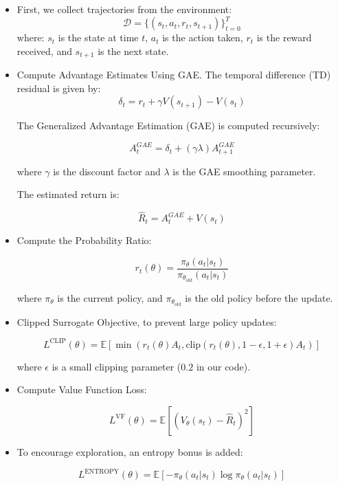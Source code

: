 \documentclass[../CSC_52081_EP.tex]{subfiles}
\begin{document}
\begin{itemize}
    \item First, we collect trajectories from the environment:
    \[
    \mathcal{D} = \{ (s_t, a_t, r_t, s_{t+1}) \}_{t=0}^{T}
    \]
    where:
    \( s_t \) is the state at time \( t \), \( a_t \) is the action taken, \( r_t \) is the reward received, and \( s_{t+1} \) is the next state.

    \item Compute Advantage Estimates Using GAE. The temporal difference (TD) residual is given by:
    \[
    \delta_t = r_t + \gamma V(s_{t+1}) - V(s_t)
    \]
    
    The Generalized Advantage Estimation (GAE) is computed recursively:
    
    \[
    A_t^{GAE} = \delta_t + (\gamma \lambda) A_{t+1}^{GAE}
    \]
    
    where \( \gamma \) is the discount factor and \( \lambda \) is the GAE smoothing parameter.

    The estimated return is:

    \[
    \hat{R}_t = A_t^{GAE} + V(s_t)
    \]

    \item Compute the Probability Ratio:

    \[
    r_t(\theta) = \frac{\pi_{\theta}(a_t | s_t)}{\pi_{\theta_{\text{old}}}(a_t | s_t)}
    \]
    
    where \( \pi_{\theta} \) is the current policy, and \( \pi_{\theta_{\text{old}}} \) is the old policy before the update.

    \item Clipped Surrogate Objective, to prevent large policy updates:

    \[
    L^{\text{CLIP}}(\theta) = \mathbb{E} \left[ \min \left( r_t(\theta) A_t, \text{clip}(r_t(\theta), 1 - \epsilon, 1 + \epsilon) A_t \right) \right]
    \]
    
    where \( \epsilon \) is a small clipping parameter (\( 0.2 \) in our code).

    \item Compute Value Function Loss:

    \[
    L^{\text{VF}}(\theta) = \mathbb{E} \left[ (V_{\theta}(s_t) - \hat{R}_t)^2 \right]
    \]

    \item To encourage exploration, an entropy bonus is added:

    \[
    L^{\text{ENTROPY}}(\theta) = \mathbb{E} \left[ -\pi_{\theta}(a_t | s_t) \log \pi_{\theta}(a_t | s_t) \right]
    \]


\end{itemize}
\end{document}
